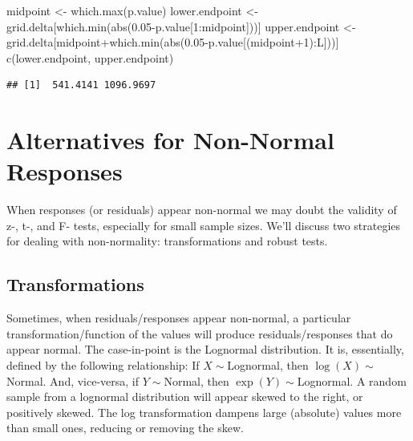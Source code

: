 \documentclass[
]{book}
\newenvironment{Shaded}{\begin{snugshade}}{\end{snugshade}}
\newcommand{\DecValTok}[1]{\textcolor[rgb]{0.00,0.00,0.81}{#1}}
\newcommand{\FloatTok}[1]{\textcolor[rgb]{0.00,0.00,0.81}{#1}}
\newcommand{\FunctionTok}[1]{\textcolor[rgb]{0.00,0.00,0.00}{#1}}
\newcommand{\NormalTok}[1]{#1}
\newcommand{\OtherTok}[1]{\textcolor[rgb]{0.56,0.35,0.01}{#1}}
\newcommand{\SpecialCharTok}[1]{\textcolor[rgb]{0.00,0.00,0.00}{#1}}
\begin{document}
\begin{Shaded}
\begin{Highlighting}[]
\NormalTok{midpoint }\OtherTok{\textless{}{-}} \FunctionTok{which.max}\NormalTok{(p.value)}
\NormalTok{lower.endpoint }\OtherTok{\textless{}{-}}\NormalTok{ grid.delta[}\FunctionTok{which.min}\NormalTok{(}\FunctionTok{abs}\NormalTok{(}\FloatTok{0.05}\SpecialCharTok{{-}}\NormalTok{p.value[}\DecValTok{1}\SpecialCharTok{:}\NormalTok{midpoint]))]}
\NormalTok{upper.endpoint }\OtherTok{\textless{}{-}}\NormalTok{ grid.delta[midpoint}\SpecialCharTok{+}\FunctionTok{which.min}\NormalTok{(}\FunctionTok{abs}\NormalTok{(}\FloatTok{0.05}\SpecialCharTok{{-}}\NormalTok{p.value[(midpoint}\SpecialCharTok{+}\DecValTok{1}\NormalTok{)}\SpecialCharTok{:}\NormalTok{L]))]}
\FunctionTok{c}\NormalTok{(lower.endpoint, upper.endpoint)}
\end{Highlighting}
\end{Shaded}

\begin{verbatim}
## [1]  541.4141 1096.9697
\end{verbatim}

\hypertarget{alternatives-for-non-normal-responses}{%
\chapter{Alternatives for Non-Normal Responses}\label{alternatives-for-non-normal-responses}}

When responses (or residuals) appear non-normal we may doubt the validity of z-, t-, and F- tests, especially for small sample sizes. We'll discuss two strategies for dealing with non-normality: transformations and robust tests.

\hypertarget{transformations}{%
\section{Transformations}\label{transformations}}

Sometimes, when residuals/responses appear non-normal, a particular transformation/function of the values will produce residuals/responses that do appear normal. The case-in-point is the Lognormal distribution. It is, essentially, defined by the following relationship: If \(X\sim\)Lognormal, then \(\log(X)\sim\)Normal. And, vice-versa, if \(Y\sim\)Normal, then \(\exp(Y)\sim\)Lognormal. A random sample from a lognormal distribution will appear skewed to the right, or positively skewed. The log transformation dampens large (absolute) values more than small ones, reducing or removing the skew.
\end{document}

